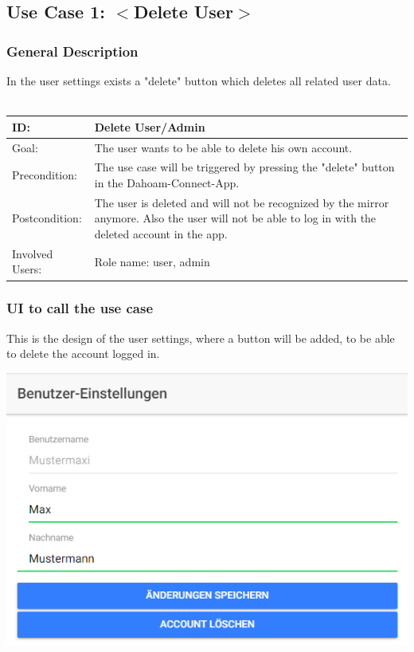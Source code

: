 \documentclass[12pt]{article}
\theoremstyle{definition}
\begin{document}
\subsection{Use Case 1: $<$Delete User$>$}
\subsubsection{General Description}
In the user settings exists a "delete" button which deletes all related user data.
\\
\\
\begin{tabular}{|p{.2\linewidth}|p{.65\linewidth}|}
\hline 
ID: & Delete User/Admin \\ \hline
Goal: & The user wants to be able to delete his own account. \\ \hline
Precondition: & The use case will be triggered by pressing the "delete" button in the Dahoam-Connect-App. \\ \hline
Postcondition: & The user is deleted and will not be recognized by the mirror anymore. Also the user will not be able to log in with the deleted account in the app. \\ \hline
Involved Users: & Role name: user, admin  \\ \hline
\end{tabular}

\subsubsection{UI to call the use case}
This is the design of the user settings, where a button will be added, to be able to delete the account logged in.

\begin{center}
\includegraphics[scale=.8]{UseCase/DeleteUserFirstStep.PNG}\\
\end{center}
\end{document}
